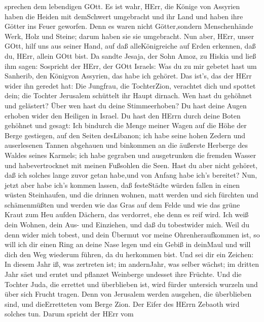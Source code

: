 sprechen dem lebendigen GOtt.  Es ist wahr, HErr, die
Könige von Assyrien haben die Heiden mit demSchwert umgebracht und ihr
Land  und haben ihre Götter ins Feuer geworfen. Denn es
waren nicht Götter,sondern Menschenhände Werk, Holz und Steine; darum
haben sie sie umgebracht.  Nun aber, HErr, unser GOtt, hilf
uns aus seiner Hand, auf daß alleKönigreiche auf Erden erkennen, daß du,
HErr, allein GOtt bist.  Da sandte Jesaja, der Sohn Amoz,
zu Hiskia und ließ ihm sagen: Sospricht der HErr, der GOtt Israels: Was
du zu mir gebetet hast um Sanherib, den Königvon Assyrien, das habe ich
gehöret.  Das ist's, das der HErr wider ihn geredet hat:
Die Jungfrau, die TochterZion, verachtet dich und spottet dein; die
Tochter Jerusalem schüttelt ihr Haupt dirnach.  Wen hast du
gehöhnet und gelästert? Über wen hast du deine Stimmeerhoben? Du hast
deine Augen erhoben wider den Heiligen in Israel.  Du hast
den HErrn durch deine Boten gehöhnet und gesagt: Ich bindurch die Menge
meiner Wagen auf die Höhe der Berge gestiegen, auf den Seiten
desLibanon; ich habe seine hohen Zedern und auserlesenen Tannen
abgehauen und binkommen an die äußerste Herberge des Waldes seines
Karmels;  ich habe gegraben und ausgetrunken die fremden
Wasser und habevertrocknet mit meinen Fußsohlen die Seen. 
Hast du aber nicht gehöret, daß ich solches lange zuvor getan habe,und
von Anfang habe ich's bereitet? Nun, jetzt aber habe ich's kommen
lassen, daß festeStädte würden fallen in einen wüsten Steinhaufen,
 und die drinnen wohnen, matt werden und sich fürchten und
schämenmüßten und werden wie das Gras auf dem Felde und wie das grüne
Kraut zum Heu aufden Dächern, das verdorret, ehe denn es reif wird.
 Ich weiß dein Wohnen, dein Aus- und Einziehen, und daß du
tobestwider mich.  Weil du denn wider mich tobest, und dein
Übermut vor meine Ohrenheraufkommen ist, so will ich dir einen Ring an
deine Nase legen und ein Gebiß in deinMaul und will dich den Weg
wiederum führen, da du herkommen bist.  Und sei dir ein
Zeichen: In diesem Jahr iß, was zertreten ist; im andernJahr, was selber
wächst; im dritten Jahr säet und erntet und pflanzet Weinberge undesset
ihre Früchte.  Und die Tochter Juda, die errettet und
überblieben ist, wird fürder untersich wurzeln und über sich Frucht
tragen.  Denn von Jerusalem werden ausgehen, die
überblieben sind, und dieErretteten vom Berge Zion. Der Eifer des HErrn
Zebaoth wird solches tun.  Darum spricht der HErr vom
